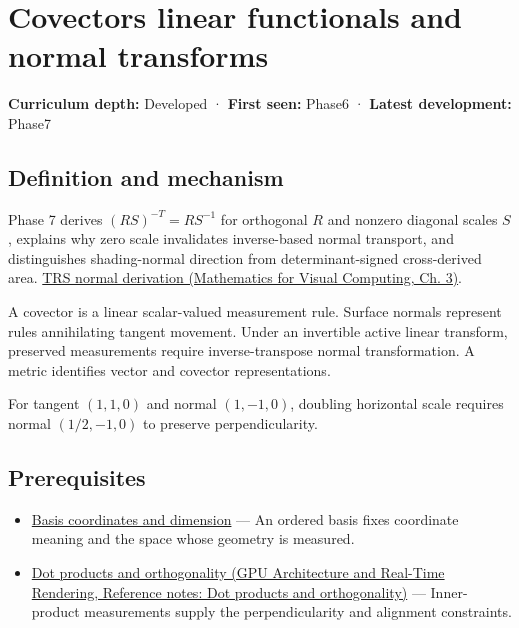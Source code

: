 \hypertarget{appendix-46da295c6787}{}\label{referencestart:appendix-46da295c6787}
\section{Covectors linear functionals and normal transforms}\label{appendix-46da295c6787-covectors-linear-functionals-and-normal-transforms}

\textbf{Curriculum depth:} Developed · \textbf{First seen:} Phase6 · \textbf{Latest development:} Phase7

\begin{allmightroledefinition}

\subsection{Definition and mechanism}\label{appendix-46da295c6787-definition-and-mechanism}

Phase 7 derives \((RS)^{-T}=RS^{-1}\) for orthogonal \(R\) and nonzero diagonal scales \(S\), explains why zero scale invalidates inverse-based normal transport, and distinguishes shading-normal direction from determinant-signed cross-derived area. \href{../02-Mathematics-for-Visual-Computing/main.pdf\#nameddest=01-foundations-i-ch019-normals-undo-scale-before-following-rotation}{TRS normal derivation (Mathematics for Visual Computing, Ch. 3)}.

\end{allmightroledefinition}

A covector is a linear scalar-valued measurement rule. Surface normals represent rules annihilating tangent movement. Under an invertible active linear transform, preserved measurements require inverse-transpose normal transformation. A metric identifies vector and covector representations.

For tangent \((1,1,0)\) and normal \((1,-1,0)\), doubling horizontal scale requires normal \((1/2,-1,0)\) to preserve perpendicularity.

\subsection{Prerequisites}\label{appendix-46da295c6787-prerequisites}

\begin{itemize}
\tightlist
\item
  \hyperref[appendix-ce0341f7ea0d]{Basis coordinates and dimension} --- An ordered basis fixes coordinate meaning and the space whose geometry is measured.
\item
  \href{../06-GPU-Architecture-and-Real-Time-Rendering/main.pdf\#nameddest=appendix-8bc4e8fc547c}{Dot products and orthogonality (GPU Architecture and Real-Time Rendering, Reference notes: Dot products and orthogonality)} --- Inner-product measurements supply the perpendicularity and alignment constraints.
\end{itemize}

